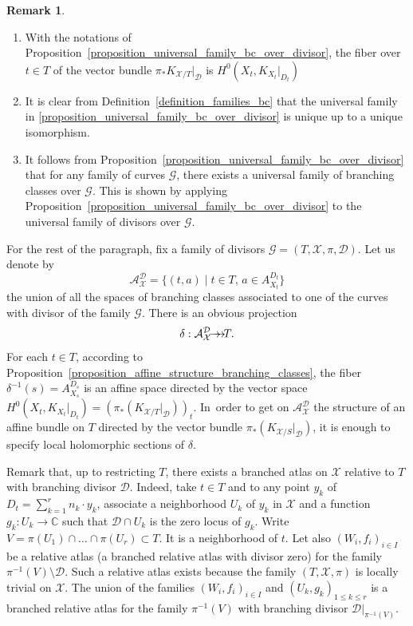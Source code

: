 \documentclass[JEP,XML,SOM,Unicode,NoEqCountersInSection,published]{cedram}
\newcommand{\onto}{\mathchoice{\to\hspace*{-5mm}\to}{\to\hspace*{-2.85mm}\to}{\to\hspace*{-3mm}\to}{\to\hspace*{-3mm}\to}}
\theoremstyle{definition}
\newtheorem{remark}[definition]{Remark}
\theoremstyle{plain}
\begin{document}
\skpt
\begin{remark}
\begin{enumerate}
\item
With the notations of Proposition~\ref{proposition_universal_family_bc_over_divisor}, the fiber over $t \in T$ of the vector bundle $\pi_*K_{\mathcal X/T}|_{\mathcal D}$ is $H^0\left(X_t, K_{X_t}|_{D_t}\right)$
\item
It is clear from Definition~\ref{definition_families_bc} that the universal family in \ref{proposition_universal_family_bc_over_divisor} is unique up to a unique isomorphism.
\item[(iii)]
It follows from Proposition~\ref{proposition_universal_family_bc_over_divisor} that for any family of curves $\mathcal G$, there exists a universal family of branching classes over $\mathcal G$.
This is shown by applying Proposition~\ref{proposition_universal_family_bc_over_divisor} to the universal family of divisors over $\mathcal G$.
\end{enumerate}
\end{remark}

For the rest of the paragraph, fix a family of divisors $\mathcal G = (T, \mathcal X, \pi, \mathcal D)$.
Let us denote by
\begin{equation}\label{eq_base_univ_family_bc_over_divisor}
\mathcal A_{\mathcal X}^{\mathcal D} = \bigl \{(t, a)\mid t \in T,\, a \in A_{X_t}^{D_t} \bigr \}
\end{equation}
the union of all the spaces of branching classes associated to one of the curves with divisor of the family $\mathcal G$.
There is an obvious projection
\begin{equation}\label{eq_proj_bc_divisors}
\delta: \mathcal A_{\mathcal X}^{\mathcal D} \onto T.
\end{equation}
For each $t \in T$, according to Proposition~\ref{proposition_affine_structure_branching_classes}, the fiber $\delta^{-1}(s) = A_{X_s}^{D_s}$ is an affine space directed by the vector space $H^0(X_t, K_{X_t}|_{D_t}) = \left(\pi_*\left( K_{\mathcal X/T}|_{\mathcal D} \right) \right)_t$. In~order to get on $\mathcal A_{\mathcal X}^{\mathcal D}$ the structure of an affine bundle on $T$ directed by the vector bundle $\pi_*\left( K_{\mathcal X/S}|_{\mathcal D} \right)$, it is enough to specify local holomorphic sections of $\delta$.

Remark that, up to restricting $T$, there exists a branched atlas on $\mathcal X$ relative to $T$ with branching divisor $\mathcal D$.
Indeed, take $t \in T$ and to any point $y_k$ of $D_t = \sum_{k = 1}^r n_k \cdot y_k$, associate a neighborhood $U_k$ of $y_k$ in $\mathcal X$ and a function $g_k: U_k \to \mathbb C$ such that $\mathcal D \cap U_k$ is the zero locus of $g_k$.
Write $V = \pi(U_1) \cap \dots \cap \pi(U_r) \subset T$.
It is a neighborhood of $t$.
Let also $(W_i, f_i)_{i \in I}$ be a relative atlas (\ie a branched relative atlas with divisor zero) for the family $\pi^{-1}(V) \setminus \mathcal D$.
Such a relative atlas exists because the family $(T, \mathcal X, \pi)$ is locally trivial on $\mathcal X$.
The union of the families $(W_i, f_i)_{i \in I}$ and $(U_k, g_k)_{1 \le k \le r}$ is a branched relative atlas for the family $\pi^{-1}(V)$ with branching divisor $\mathcal D|_{\pi^{-1}(V)}$.
\end{document}
